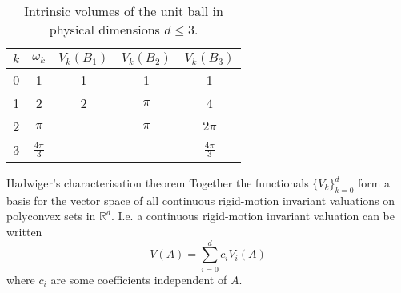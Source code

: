 \begin{SCtable}
  \begin{minipage}[b]{\linewidth}
    \centering
    \begin{tabular}{ccccc}
      \toprule
      $k$ & $\omega_k$ & $V_k(B_1)$ & $V_k(B_2)$ & $V_k(B_3)$ \\
      \midrule
      0 & 1 & 1 & 1 & 1 \\
      1 & 2 & 2 & $\pi$ & 4 \\
      2 & $\pi$ && $\pi$ & $2\pi$ \\
      3 & $\frac{4\pi}{3}$ &&& $\frac{4\pi}{3}$ \\
      \bottomrule
    \end{tabular}
  \end{minipage}
  \caption{Intrinsic volumes of the unit ball in physical dimensions $d \le 3$.}
\end{SCtable}

\begin{theorem}{Hadwiger's characterisation theorem}
  Together the functionals $\{V_k\}_{k=0}^d$ form a basis for the vector space of all continuous rigid-motion invariant valuations on polyconvex sets in $\mathbb{R}^d$.
I.e. a continuous rigid-motion invariant valuation can be written
\begin{equation}
  V(A) = \sum_{i=0}^d c_i V_i(A)
\end{equation}
where $c_i$ are some coefficients independent of $A$.
\end{theorem}

